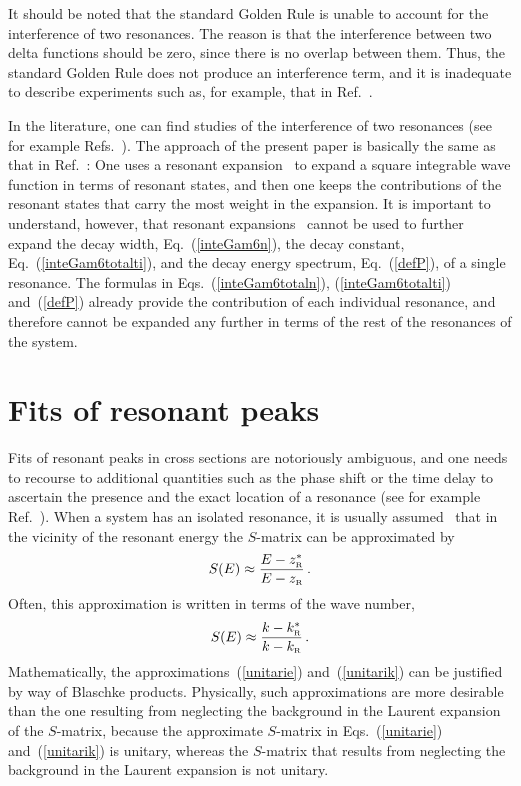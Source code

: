 \documentclass[12pt]{article}
\newcommand{\zr}{z_{\text{\tiny R}}}
\newcommand{\kr}{k_{\text{\tiny R}}}
\begin{document}
It should be noted that the standard Golden Rule is 
unable to account for the interference of two resonances. The
reason is that the interference between two delta functions should be zero,
since there is no overlap between them. Thus, the standard Golden Rule
does not produce an interference term, and it is inadequate to describe
experiments such as, for example, that in Ref.~\cite{BESIII2}.

In the literature, one can find studies of the interference of two
resonances (see for example Refs.~\cite{PESKIN,ROTTER1,ROTTER2,SASADA}). The
approach of the present paper is basically the same as that in 
Ref.~\cite{SASADA}: One uses a resonant expansion~\cite{TOLSTIKHIN1,05CJP,TOLSTIKHIN2,TOLSTIKHIN3,GASTON12,HATANO14,BROWN16} to expand a square integrable 
wave function in terms of resonant states, and then one keeps the contributions
of the resonant states that carry the most weight in the expansion. It
is important to understand, however, that resonant 
expansions~\cite{TOLSTIKHIN1,05CJP,TOLSTIKHIN2,TOLSTIKHIN3,GASTON12,HATANO14,BROWN16} cannot be used to further expand the decay 
width, Eq.~(\ref{inteGam6n}), the decay constant, Eq.~(\ref{inteGam6totalti}), 
and the decay energy spectrum, Eq.~(\ref{defP}), of a single resonance. The 
formulas in
Eqs.~(\ref{inteGam6totaln}), (\ref{inteGam6totalti}) and~(\ref{defP}) already
provide the contribution of each individual resonance, and therefore cannot
be expanded any further in terms of the rest of the resonances of the system.







\section{Fits of resonant peaks}
\setcounter{equation}{0}
\label{sec:crosspeaks}


Fits of resonant peaks in cross sections are notoriously ambiguous, and 
one needs to recourse to additional quantities such as the phase shift
or the time delay to ascertain the presence and the exact location of a 
resonance (see for example Ref.~\cite{LUNAACOSTA}). When a system has an 
isolated resonance, it is usually assumed~\cite{TAYLOR} that in the vicinity 
of the resonant energy the $S$-matrix can be approximated by 
\begin{equation}
       S(E) \approx \frac{E-\zr ^*}{E-\zr} \, .
      \label{unitarie}
\end{equation}
Often, this approximation is written in terms of the wave number,
\begin{equation}
       S(E) \approx \frac{k-\kr ^*}{k-\kr} \, .
       \label{unitarik}
\end{equation}
Mathematically, the approximations~(\ref{unitarie}) and~(\ref{unitarik}) 
can be justified by way of Blaschke products. Physically, such
approximations are more desirable than the one resulting from neglecting 
the background in the Laurent expansion of the $S$-matrix, because the 
approximate
$S$-matrix in Eqs.~(\ref{unitarie}) and~(\ref{unitarik}) is unitary, whereas
the $S$-matrix that results from neglecting the background
in the Laurent expansion is not unitary. 
\end{document}
